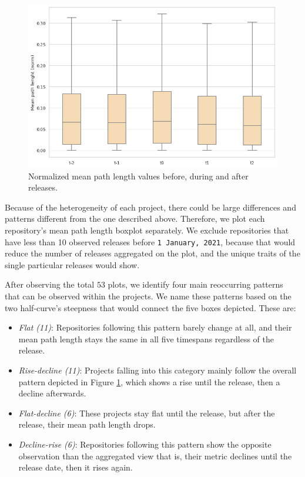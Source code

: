 \begin{figure}
    \centering
    \includegraphics[width=\textwidth]{figures/quantitative/boxplots/mean_path.png}
    \caption{Normalized mean path length values before, during and after releases.}
    \label{fig:box-mean-path}
\end{figure}

Because of the heterogeneity of each project, there could be large differences and patterns different from the one described above. Therefore, we plot each repository's mean path length boxplot separately. We exclude repositories that have less than 10 observed releases before \texttt{1 January, 2021}, because that would reduce the number of releases aggregated on the plot, and the unique traits of the single particular releases would show.

After observing the total $53$ plots, we identify four main reoccurring patterns that can be observed within the projects. We name these patterns based on the two half-curve's steepness that would connect the five boxes depicted. These are:

\begin{itemize}
    \item \textit{Flat (11)}: Repositories following this pattern barely change at all, and their mean path length stays the same in all five timespans regardless of the release.
    \item \textit{Rise-decline (11)}: Projects falling into this category mainly follow the overall pattern depicted in Figure \ref{fig:box-mean-path}, which shows a rise until the release, then a decline afterwards.
    \item \textit{Flat-decline (6)}: These projects stay flat until the release, but after the release, their mean path length drops.
    \item \textit{Decline-rise (6)}: Repositories following this pattern show the opposite observation than the aggregated view that is, their metric declines until the release date, then it rises again.
\end{itemize}

